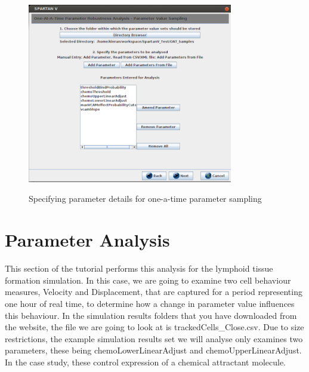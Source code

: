 \documentclass[a4paper,11pt]{article}
\begin{document}
\begin{enumerate}
\begin{figure}
\centering
    \includegraphics[width=0.8\textwidth]{SpartanV_OAT1.png}\\ \noindent
    \caption{Specifying parameter details for one-a-time parameter sampling}
    \label{OAT_Screen1}
    \newpage 
\end{figure}

\end{enumerate}

\section{Parameter Analysis}
\noindent This section of the tutorial performs this analysis for the lymphoid tissue formation simulation. In this case, we are going to examine two cell behaviour measures, Velocity and Displacement, that are captured for a period representing one hour of real time, to determine how a change in parameter value influences this behaviour. In the simulation results folders that you have downloaded from the website, the file we are going to look at is trackedCells\_Close.csv. Due to size restrictions, the example simulation results set we will analyse only examines two parameters, these being chemoLowerLinearAdjust and chemoUpperLinearAdjust. In the case study, these control expression of a chemical attractant molecule.
\end{document}
